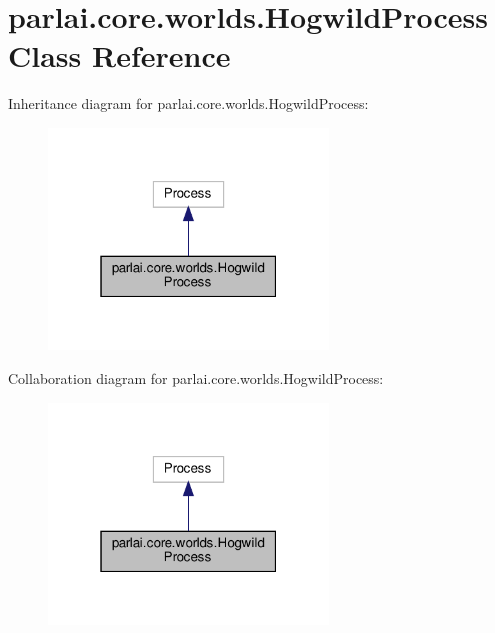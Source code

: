 \hypertarget{classparlai_1_1core_1_1worlds_1_1HogwildProcess}{}\section{parlai.\+core.\+worlds.\+Hogwild\+Process Class Reference}
\label{classparlai_1_1core_1_1worlds_1_1HogwildProcess}


Inheritance diagram for parlai.\+core.\+worlds.\+Hogwild\+Process\+:
\nopagebreak
\begin{figure}[H]
\begin{center}
\leavevmode
\includegraphics[width=211pt]{de/d43/classparlai_1_1core_1_1worlds_1_1HogwildProcess__inherit__graph}
\end{center}
\end{figure}


Collaboration diagram for parlai.\+core.\+worlds.\+Hogwild\+Process\+:
\nopagebreak
\begin{figure}[H]
\begin{center}
\leavevmode
\includegraphics[width=211pt]{de/d3d/classparlai_1_1core_1_1worlds_1_1HogwildProcess__coll__graph}
\end{center}
\end{figure}
